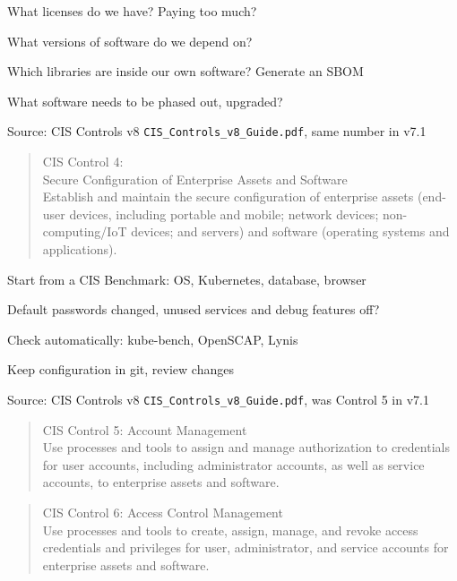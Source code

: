 \documentclass[Screen16to9,17pt]{foils}
\begin{document}
\begin{list1}
\item What licenses do we have? Paying too much?
\item What versions of software do we depend on?
\item Which libraries are inside our own software? Generate an SBOM
\item What software needs to be phased out, upgraded?
\end{list1}

Source: CIS Controls v8 \verb+CIS_Controls_v8_Guide.pdf+, same number in v7.1



\begin{quote}
CIS Control 4:\\
Secure Configuration of Enterprise Assets and Software\\
Establish and maintain the secure configuration of enterprise assets (end-user devices, including portable and mobile; network devices; non-computing/IoT devices; and servers) and software (operating systems and applications).
\end{quote}

\begin{list1}
\item Start from a CIS Benchmark: OS, Kubernetes, database, browser
\item Default passwords changed, unused services and debug features off?
\item Check automatically: kube-bench, OpenSCAP, Lynis
\item Keep configuration in git, review changes
\end{list1}

Source: CIS Controls v8 \verb+CIS_Controls_v8_Guide.pdf+, was Control 5 in v7.1



\begin{quote}
CIS Control 5: Account Management\\
Use processes and tools to assign and manage authorization to credentials for user accounts, including administrator accounts, as well as service accounts, to enterprise assets and software.
\end{quote}

\begin{quote}
CIS Control 6: Access Control Management\\
Use processes and tools to create, assign, manage, and revoke access credentials and privileges for user, administrator, and service accounts for enterprise assets and software.
\end{quote}
\end{document}
